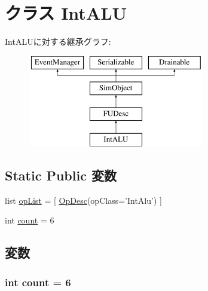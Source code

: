 \hypertarget{classFuncUnitConfig_1_1IntALU}{
\section{クラス IntALU}
\label{classFuncUnitConfig_1_1IntALU}
}
IntALUに対する継承グラフ:\begin{figure}[H]
\begin{center}
\leavevmode
\includegraphics[height=4cm]{classFuncUnitConfig_1_1IntALU}
\end{center}
\end{figure}
\subsection*{Static Public 変数}
\begin{DoxyCompactItemize}
\item 
list \hyperlink{classFuncUnitConfig_1_1IntALU_a31b2f9e3ac9a504397b140f513c469cc}{opList} = \mbox{[} \hyperlink{classOpDesc}{OpDesc}(opClass='IntAlu') \mbox{]}
\item 
int \hyperlink{classFuncUnitConfig_1_1IntALU_ad43c3812e6d13e0518d9f8b8f463ffcf}{count} = 6
\end{DoxyCompactItemize}


\subsection{変数}
\hypertarget{classFuncUnitConfig_1_1IntALU_ad43c3812e6d13e0518d9f8b8f463ffcf}{
\subsubsection[{count}]{\setlength{\rightskip}{0pt plus 5cm}int {\bf count} = 6}}
\label{classFuncUnitConfig_1_1IntALU_ad43c3812e6d13e0518d9f8b8f463ffcf}


